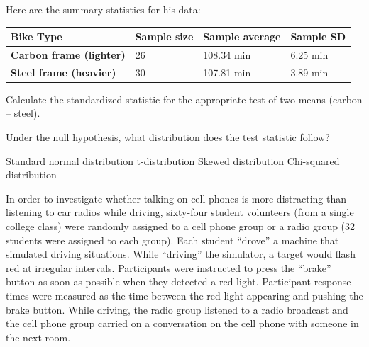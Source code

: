 \documentclass{article}
\begin{document}
\begin{mcquestions}
\begin{mcquestioninstruction}
			Here are the summary statistics for his data:
			
			\begin{center}
				\begin{tabular}{| l | l | l | l |}
					\hline
					\textbf{Bike Type} & \textbf{Sample size} & \textbf{Sample average} & \textbf{Sample SD} \\
					\hline
					\textbf{Carbon frame (lighter)} & 26 & 108.34 min & 6.25 min \\
					\hline
					\textbf{Steel frame (heavier)} & 30 & 107.81 min & 3.89 min \\
					\hline
				\end{tabular}
			\end{center}
		\end{mcquestioninstruction}
		
		\question Calculate the standardized statistic for the appropriate test of two means (carbon – steel).
		\begin{mcanswerslist}
		\end{mcanswerslist}
		
		\question[follow] Under the null hypothesis, what distribution does the test statistic follow?
		\begin{mcanswerslist}
			\answer Standard normal distribution
			\answer[correct] t-distribution
			\answer Skewed distribution
			\answer Chi-squared distribution
		\end{mcanswerslist}
		
		\begin{mcquestioninstruction}
			In order to investigate whether talking on cell phones is more distracting than listening to car radios while driving, sixty-four student volunteers (from a single college class) were randomly assigned to a cell phone group or a radio group (32 students were assigned to each group). Each student ``drove'' a machine that simulated driving situations. While ``driving'' the simulator, a target would flash red at irregular intervals. Participants were instructed to press the ``brake'' button as soon as possible when they detected a red light. Participant response times were measured as the time between the red light appearing and pushing the brake button. While driving, the radio group listened to a radio broadcast and the cell phone group carried on a conversation on the cell phone with someone in the next room.
		\end{mcquestioninstruction}
		

\end{mcquestions}
\end{document}
